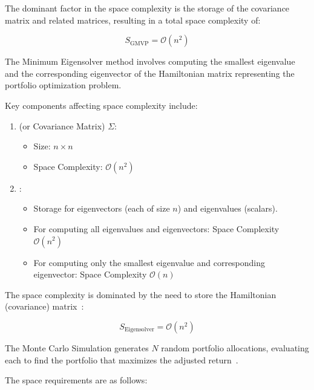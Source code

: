 \documentclass[%
 reprint,
 amsmath,amssymb,
 aps,
]{revtex4-2}
\begin{document}
The dominant factor in the space complexity is the storage of the covariance matrix and related matrices, resulting in a total space complexity of:

\begin{equation}
S_{\text{GMVP}} = \mathcal{O}(n^2)
\end{equation}

The Minimum Eigensolver method involves computing the smallest eigenvalue and the corresponding eigenvector of the Hamiltonian matrix representing the portfolio optimization problem.

Key components affecting space complexity include:

\begin{enumerate}
    \item {} (or Covariance Matrix) $\Sigma$:
    \begin{itemize}
        \item Size: $n \times n$
        \item Space Complexity: $\mathcal{O}(n^2)$
    \end{itemize}
    
    \item {}:
    \begin{itemize}
        \item Storage for eigenvectors (each of size $n$) and eigenvalues (scalars).
        \item For computing all eigenvalues and eigenvectors: Space Complexity $\mathcal{O}(n^2)$
        \item For computing only the smallest eigenvalue and corresponding eigenvector: Space Complexity $\mathcal{O}(n)$
    \end{itemize}
\end{enumerate}

The space complexity is dominated by the need to store the Hamiltonian (covariance) matrix~\cite{Markowitz1952}:

\begin{equation} S_{\text{Eigensolver}} = \mathcal{O}(n^2) \end{equation}

The Monte Carlo Simulation generates $N$ random portfolio allocations, evaluating each to find the portfolio that maximizes the adjusted return~\cite{Boyd2004}.

The space requirements are as follows:
\end{document}
